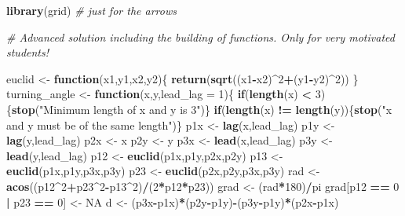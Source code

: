 \documentclass[]{book}
\newenvironment{Shaded}{\begin{snugshade}}{\end{snugshade}}
\newcommand{\KeywordTok}[1]{\textcolor[rgb]{0.13,0.29,0.53}{\textbf{#1}}}
\newcommand{\DataTypeTok}[1]{\textcolor[rgb]{0.13,0.29,0.53}{#1}}
\newcommand{\DecValTok}[1]{\textcolor[rgb]{0.00,0.00,0.81}{#1}}
\newcommand{\StringTok}[1]{\textcolor[rgb]{0.31,0.60,0.02}{#1}}
\newcommand{\CommentTok}[1]{\textcolor[rgb]{0.56,0.35,0.01}{\textit{#1}}}
\newcommand{\OtherTok}[1]{\textcolor[rgb]{0.56,0.35,0.01}{#1}}
\newcommand{\ControlFlowTok}[1]{\textcolor[rgb]{0.13,0.29,0.53}{\textbf{#1}}}
\newcommand{\OperatorTok}[1]{\textcolor[rgb]{0.81,0.36,0.00}{\textbf{#1}}}
\newcommand{\NormalTok}[1]{#1}
\begin{document}
\begin{Shaded}
\begin{Highlighting}[]
\KeywordTok{library}\NormalTok{(grid) }\CommentTok{# just for the arrows}


\CommentTok{# Advanced solution including the building of functions. Only for very motivated students!}

\NormalTok{euclid <-}\StringTok{ }\ControlFlowTok{function}\NormalTok{(x1,y1,x2,y2)\{}
  \KeywordTok{return}\NormalTok{(}\KeywordTok{sqrt}\NormalTok{((x1}\OperatorTok{-}\NormalTok{x2)}\OperatorTok{^}\DecValTok{2}\OperatorTok{+}\NormalTok{(y1}\OperatorTok{-}\NormalTok{y2)}\OperatorTok{^}\DecValTok{2}\NormalTok{))}
\NormalTok{\}}
\NormalTok{turning_angle <-}\StringTok{ }\ControlFlowTok{function}\NormalTok{(x,y,}\DataTypeTok{lead_lag =} \DecValTok{1}\NormalTok{)\{}
  \ControlFlowTok{if}\NormalTok{(}\KeywordTok{length}\NormalTok{(x) }\OperatorTok{<}\StringTok{ }\DecValTok{3}\NormalTok{)\{}\KeywordTok{stop}\NormalTok{(}\StringTok{"Minimum length of x and y is 3"}\NormalTok{)\}}
  \ControlFlowTok{if}\NormalTok{(}\KeywordTok{length}\NormalTok{(x) }\OperatorTok{!=}\StringTok{ }\KeywordTok{length}\NormalTok{(y))\{}\KeywordTok{stop}\NormalTok{(}\StringTok{"x and y must be of the same length"}\NormalTok{)\}}
\NormalTok{  p1x <-}\StringTok{ }\KeywordTok{lag}\NormalTok{(x,lead_lag)}
\NormalTok{  p1y <-}\StringTok{ }\KeywordTok{lag}\NormalTok{(y,lead_lag)}
\NormalTok{  p2x <-}\StringTok{ }\NormalTok{x}
\NormalTok{  p2y <-}\StringTok{ }\NormalTok{y}
\NormalTok{  p3x <-}\StringTok{ }\KeywordTok{lead}\NormalTok{(x,lead_lag)}
\NormalTok{  p3y <-}\StringTok{ }\KeywordTok{lead}\NormalTok{(y,lead_lag)}
\NormalTok{  p12 <-}\StringTok{ }\KeywordTok{euclid}\NormalTok{(p1x,p1y,p2x,p2y)}
\NormalTok{  p13 <-}\StringTok{ }\KeywordTok{euclid}\NormalTok{(p1x,p1y,p3x,p3y)}
\NormalTok{  p23 <-}\StringTok{ }\KeywordTok{euclid}\NormalTok{(p2x,p2y,p3x,p3y)}
\NormalTok{  rad <-}\StringTok{ }\KeywordTok{acos}\NormalTok{((p12}\OperatorTok{^}\DecValTok{2}\OperatorTok{+}\NormalTok{p23}\OperatorTok{^}\DecValTok{2}\OperatorTok{-}\NormalTok{p13}\OperatorTok{^}\DecValTok{2}\NormalTok{)}\OperatorTok{/}\NormalTok{(}\DecValTok{2}\OperatorTok{*}\NormalTok{p12}\OperatorTok{*}\NormalTok{p23))}
\NormalTok{  grad <-}\StringTok{ }\NormalTok{(rad}\OperatorTok{*}\DecValTok{180}\NormalTok{)}\OperatorTok{/}\NormalTok{pi}
\NormalTok{  grad[p12 }\OperatorTok{==}\StringTok{ }\DecValTok{0} \OperatorTok{|}\StringTok{ }\NormalTok{p23 }\OperatorTok{==}\StringTok{ }\DecValTok{0}\NormalTok{] <-}\StringTok{ }\OtherTok{NA}
\NormalTok{  d <-}\StringTok{  }\NormalTok{(p3x}\OperatorTok{-}\NormalTok{p1x)}\OperatorTok{*}\NormalTok{(p2y}\OperatorTok{-}\NormalTok{p1y)}\OperatorTok{-}\NormalTok{(p3y}\OperatorTok{-}\NormalTok{p1y)}\OperatorTok{*}\NormalTok{(p2x}\OperatorTok{-}\NormalTok{p1x)}

\end{Highlighting}
\end{Shaded}
\end{document}
